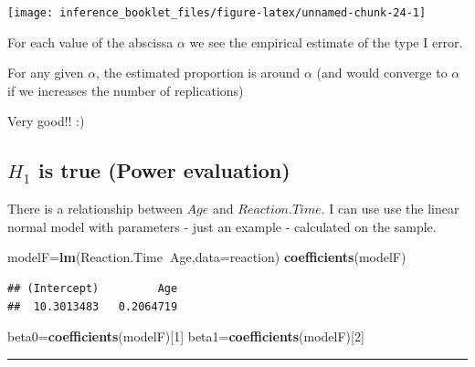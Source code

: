 \documentclass[]{article}
\newenvironment{Shaded}{\begin{snugshade}}{\end{snugshade}}
\newcommand{\KeywordTok}[1]{\textcolor[rgb]{0.13,0.29,0.53}{\textbf{#1}}}
\newcommand{\DataTypeTok}[1]{\textcolor[rgb]{0.13,0.29,0.53}{#1}}
\newcommand{\DecValTok}[1]{\textcolor[rgb]{0.00,0.00,0.81}{#1}}
\newcommand{\OperatorTok}[1]{\textcolor[rgb]{0.81,0.36,0.00}{\textbf{#1}}}
\newcommand{\NormalTok}[1]{#1}
\begin{document}
\begin{center}\texttt{[image: inference\_booklet\_files/figure-latex/unnamed-chunk-24-1]} \end{center}

For each value of the abscissa \(\alpha\) we see the empirical estimate
of the type I error.

For any given \(\alpha\), the estimated proportion is around \(\alpha\)
(and would converge to \(\alpha\) if we increases the number of
replications)

Very good!! :)

\subsection{\texorpdfstring{\(H_1\) is true (Power
evaluation)}{H\_1 is true (Power evaluation)}}\label{h_1-is-true-power-evaluation}

There is a relationship between \(Age\) and \(Reaction.Time\). I can use
use the linear normal model with parameters - just an example -
calculated on the sample.

\begin{Shaded}
\begin{Highlighting}[]
\NormalTok{modelF=}\KeywordTok{lm}\NormalTok{(Reaction.Time}\OperatorTok{~}\NormalTok{Age,}\DataTypeTok{data=}\NormalTok{reaction)}
\KeywordTok{coefficients}\NormalTok{(modelF)}
\end{Highlighting}
\end{Shaded}

\begin{verbatim}
## (Intercept)         Age 
##  10.3013483   0.2064719
\end{verbatim}

\begin{Shaded}
\begin{Highlighting}[]
\NormalTok{beta0=}\KeywordTok{coefficients}\NormalTok{(modelF)[}\DecValTok{1}\NormalTok{]}
\NormalTok{beta1=}\KeywordTok{coefficients}\NormalTok{(modelF)[}\DecValTok{2}\NormalTok{]}
\end{Highlighting}
\end{Shaded}

\begin{center}\rule{0.5\linewidth}{\linethickness}\end{center}
\end{document}
